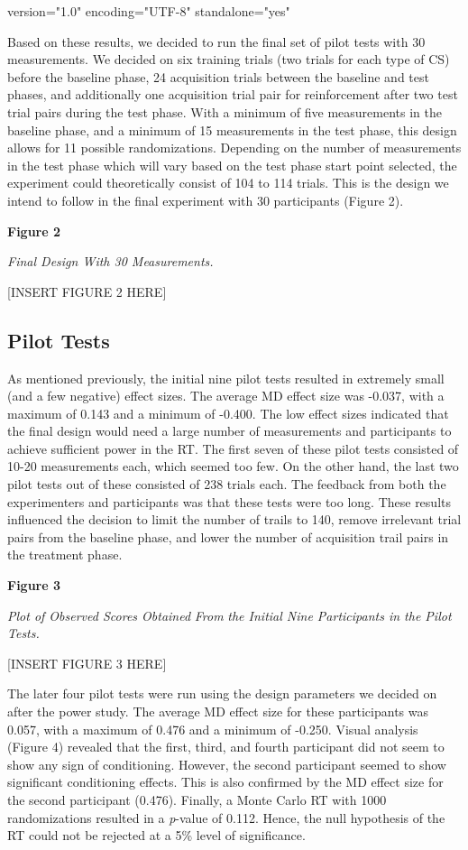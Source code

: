 version="1.0" encoding="UTF-8" standalone="yes" \documentclass{article}
\begin{document}
Based on these results, we decided to run the final set of pilot tests with 30 measurements. We decided on six training trials (two trials for each type of CS) before the baseline phase, 24 acquisition trials between the baseline and test phases, and additionally one acquisition trial pair for reinforcement after two test trial pairs during the test phase. With a minimum of five measurements in the baseline phase, and a minimum of 15 measurements in the test phase, this design allows for 11 possible randomizations. Depending on the number of measurements in the test phase which will vary based on the test phase start point selected, the experiment could theoretically consist of 104 to 114 trials. This is the design we intend to follow in the final experiment with 30 participants (Figure 2).

\textbf{Figure 2}

\emph{Final Design With 30 Measurements.}

[INSERT FIGURE 2 HERE]

\subsection{Pilot Tests}

As mentioned previously, the initial nine pilot tests resulted in extremely small (and a few negative) effect sizes. The average MD effect size was -0.037, with a maximum of 0.143 and a minimum of -0.400. The low effect sizes indicated that the final design would need a large number of measurements and participants to achieve sufficient power in the RT. The first seven of these pilot tests consisted of 10-20 measurements each, which seemed too few. On the other hand, the last two pilot tests out of these consisted of 238 trials each. The feedback from both the experimenters and participants was that these tests were too long. These results influenced the decision to limit the number of trails to 140, remove irrelevant trial pairs from the baseline phase, and lower the number of acquisition trail pairs in the treatment phase. 

\textbf{Figure 3}

\emph{Plot of Observed Scores Obtained }\emph{From}\emph{ the Initial Nine Participants in the Pilot Tests.}

[INSERT FIGURE 3 HERE]

The later four pilot tests were run using the design parameters we decided on after the power study. The average MD effect size for these participants was 0.057, with a maximum of 0.476 and a minimum of -0.250. Visual analysis (Figure 4) revealed that the first, third, and fourth participant did not seem to show any sign of conditioning. However, the second participant seemed to show significant conditioning effects. This is also confirmed by the MD effect size for the second participant (0.476). Finally, a Monte Carlo RT with 1000 randomizations resulted in a \emph{p}-value of 0.112. Hence, the null hypothesis of the RT could not be rejected at a 5\% level of significance. 
\end{document}
